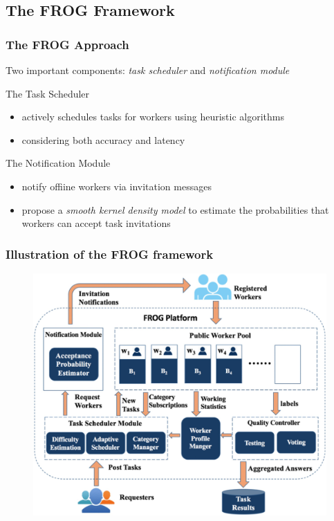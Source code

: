\documentclass[UTF8]{beamer}
\begin{document}
\subsection{The FROG Framework}
\begin{frame}
    \frametitle{The FROG Approach}
    Two important components: 
    \textit{task scheduler} and \textit{notification module}
    \begin{block}{The Task Scheduler}
        \begin{itemize}
            \item actively schedules tasks for workers using
            heuristic algorithms
            \item considering both accuracy and latency
        \end{itemize}
    \end{block}
    
    \begin{block}{The Notification Module}
        \begin{itemize}
            \item notify offiine workers via invitation messages
            \item propose a \textit{smooth kernel density model} to 
            estimate the probabilities that workers 
            can accept task invitations
        \end{itemize}
    \end{block}
\end{frame}

\begin{frame}
    \frametitle{Illustration of the FROG framework}
    \begin{figure}
        \includegraphics[width= 0.75\linewidth]{ILL.jpg}
     \end{figure}
\end{frame}
\end{document}
